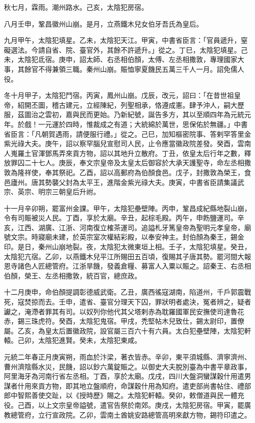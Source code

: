 \begin{pinyinscope}
 秋七月，霖雨。潮州路水。己亥，太陰犯房宿。



 八月壬申，鞏昌徽州山崩。是月，立燕鐵木兒女伯牙吾氏為皇后。



 九月甲午，太陰犯填星。乙未，太陰犯天江。甲寅，中書省臣言：「官員遞升，窒礙選法。今請自省、院、臺官外，其餘不許遞升。」從之。丁巳，太陰犯填星。己未，太陰犯氐宿。庚申，詔太師、右丞相伯顏，太傅、左丞相撒敦，專理國家大事，其餘官不得兼領三職。秦州山崩。賑恤寧夏饑民五萬三千人一月。詔免儒人役。



 冬十月甲子，太陰犯鬥宿。丙寅，鳳州山崩。戊辰，改元，詔曰：「在昔世祖皇帝，紹開丕圖，稽古建元，立經陳紀，列聖相承，恪遵成憲。肆予沖人，嗣大歷服，茲圖治之雲初，嘉與民而更始。乃新紀號，誕告多方，其以至順四年為元統元年。於戲！一元運於四時，惟裁成之有道；大統綿於萬世，思保佑於無疆。」中書省臣言：「凡朝賀遇雨，請便服行禮。」從之。己巳，加知樞密院事、答剌罕答里金紫光祿大夫。庚午，詔以察罕腦兒宣慰司人民，止令應當徽政院差發。癸酉，雲南人嵬羅土官渾鄧馬弄來貢方物，詔以其地升立散府。丁丑，依皇太后行年之數，釋放罪囚二十七人。庚辰，奉文宗皇帝及太皇太后御容於大承天護聖寺，命左丞相撒敦為隆祥使，奉其祭祀。乙酉，詔以高郵府為伯顏食邑。戊子，封撒敦為榮王，食邑廬州。唐其勢襲父封為太平王，進階金紫光祿大夫。庚寅，中書省臣請集議武宗、英宗、明宗三朝皇后升祔。



 十一月辛卯朔，罷富州金課。甲午，太陰犯壘壁陣。丙申，鞏昌成紀縣地裂山崩，令有司賑被災人民。丁酉，享於太廟。辛丑，起棕毛殿。丙午，申飭鹽運司。辛亥，江西、湖廣、江浙、河南復立榷茶運司。追謚札牙篤皇帝為聖明元孝皇帝，廟號文宗。時寢廟未建，於英宗室次權結彩殿，以奉安神主。封伯顏為秦王，錫金印。是日，秦州山崩地裂。夜，太陰犯太微東垣上相。壬子，太陰犯填星。癸丑，太陰犯亢宿。乙卯，以燕鐵木兒平江所賜田五百頃，復賜其子唐其勢。罷河間大報恩寺諸色人匠總管府。江浙旱饑，發義倉糧、募富人入粟以賑之。詔秦王、右丞相伯顏，榮王、左丞相撒敦，統百官，總庶政。



 十二月庚申，命伯顏提調彰德威武衛。乙丑，廣西徭寇湖南，陷道州，千戶郭震戰死，寇焚掠而去。壬申，遣省、臺官分理天下囚，罪狀明者處決，冤者辨之，疑者讞之，淹滯者罪其有司。以奴列你他代其父塔剌赤為耽羅國軍民安撫使司達魯花赤，錫三珠虎符。癸酉，太陰犯鬼宿。甲戌，禿堅帖木兒致仕，錫太尉印，置僚屬。乙亥，為皇太后置徽政院，設官屬三百六十有六員。太白犯壘壁陣，太陰犯軒轅。己卯，太陰犯進賢。癸未，太陰犯東咸。



 元統二年春正月庚寅朔，雨血於汴梁，著衣皆赤。辛卯，東平須城縣、濟寧濟州、曹州濟陰縣水災，民饑，詔以鈔六萬錠賑之。以御史大夫脫別臺為中書平章政事，阿里海牙為河南行省左丞相。丁酉，享於太廟。戊戌，四川大盤洞蠻謀穀什用遣男謀者什用來貢方物，即其地立盤順府，命謀穀什用為知府。遣吏部尚書帖住、禮部郎中智熙善使交趾，以《授時歷》賜之。太陰犯軒轅。癸卯，敕僧道與民一體充役。己酉，以上文宗皇帝謚號，遣官告祭於南郊。庚戌，太陰犯房宿。甲寅，罷廣教總管府，立行宣政院。乙卯，雲南土酋姚安路總管高明來獻方物，錫符印遣之。




\end{pinyinscope}
